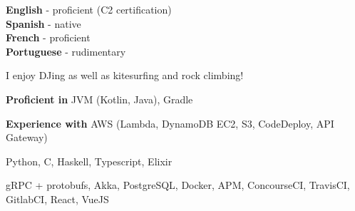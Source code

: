 \documentclass[9pt]{developercv}
\newcommand{\para}{\vspace{0.4em}}
\begin{document}
    \begin{minipage}[t]{0.45\textwidth}
        \vspace{-\baselineskip} %


        \vspace{-0.5em}
        \textbf{English} - proficient (C2 certification)\\
        \textbf{Spanish} - native\\
        \textbf{French} - proficient\\
        \textbf{Portuguese} - rudimentary\\



        \vspace{-0.5em}
        I enjoy DJing as well as kitesurfing and rock climbing!

    \end{minipage}
    \hfill
    \hspace{0.05\textwidth}
    \begin{minipage}[t]{0.5\textwidth}
        \vspace{-\baselineskip} %


        \vspace{-0.5em}
        \textbf{Proficient in} JVM (Kotlin, Java), Gradle

        \para
        \textbf{Experience with}
        AWS (Lambda, DynamoDB EC2, S3, CodeDeploy, API Gateway)

        \para

        Python, C, Haskell, Typescript, Elixir

        \para

        gRPC + protobufs, Akka, PostgreSQL, Docker, APM, ConcourseCI, TravisCI, GitlabCI, React,
        VueJS

    \end{minipage}

\end{document}

